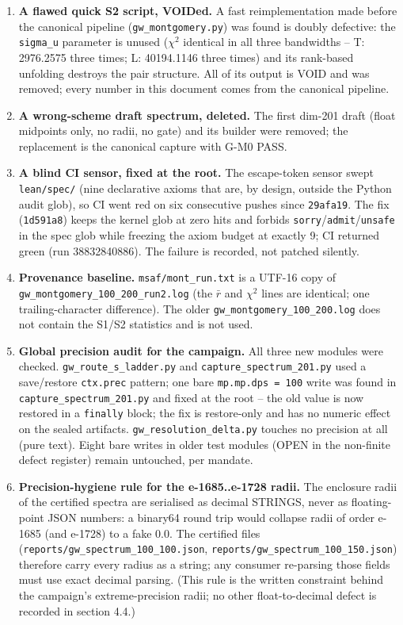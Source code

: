 \documentclass[11pt]{article}
\begin{document}
\begin{enumerate}
\item \textbf{A flawed quick S2 script, VOIDed.} A fast reimplementation
made before the canonical pipeline (\texttt{gw\_montgomery.py}) was
found is doubly defective: the \texttt{sigma\_u} parameter is unused
($\chi^2$ identical in all three bandwidths -- T: 2976.2575 three
times; L: 40194.1146 three times) and its rank-based unfolding destroys
the pair structure. All of its output is VOID and was removed; every
number in this document comes from the canonical pipeline.
\item \textbf{A wrong-scheme draft spectrum, deleted.} The first dim-201
draft (float midpoints only, no radii, no gate) and its builder were
removed; the replacement is the canonical capture with G-M0 PASS.
\item \textbf{A blind CI sensor, fixed at the root.} The escape-token
sensor swept \texttt{lean/spec/} (nine declarative axioms that are, by
design, outside the Python audit glob), so CI went red on six
consecutive pushes since \texttt{29afa19}. The fix (\texttt{1d591a8})
keeps the kernel glob at zero hits and forbids
\texttt{sorry}/\texttt{admit}/\texttt{unsafe} in the spec glob while
freezing the axiom budget at exactly 9; CI returned green (run
38832840886). The failure is recorded, not patched silently.
\item \textbf{Provenance baseline.} \texttt{msaf/mont\_run.txt} is a
UTF-16 copy of \texttt{gw\_montgomery\_100\_200\_run2.log} (the
$\bar r$ and $\chi^2$ lines are identical; one trailing-character
difference). The older \texttt{gw\_montgomery\_100\_200.log} does not
contain the S1/S2 statistics and is not used.
\item \textbf{Global precision audit for the campaign.} All three new
modules were checked. \texttt{gw\_route\_s\_ladder.py} and
\texttt{capture\_spectrum\_201.py} used a save/restore \texttt{ctx.prec}
pattern; one bare \texttt{mp.mp.dps = 100} write was found in
\texttt{capture\_spectrum\_201.py} and fixed at the root -- the old
value is now restored in a \texttt{finally} block; the fix is
restore-only and has no numeric effect on the sealed artifacts.
\texttt{gw\_resolution\_delta.py} touches no precision at all (pure
text). Eight bare writes in older test modules (OPEN in the non-finite
defect register) remain untouched, per mandate.
\item \textbf{Precision-hygiene rule for the e-1685..e-1728 radii.} The
enclosure radii of the certified spectra are serialised as decimal
STRINGS, never as floating-point JSON numbers: a binary64 round trip
would collapse radii of order e-1685 (and e-1728) to a fake 0.0. The
certified files (\texttt{reports/gw\_spectrum\_100\_100.json},
\texttt{reports/gw\_spectrum\_100\_150.json}) therefore carry every
radius as a string; any consumer re-parsing those fields must use exact
decimal parsing. (This rule is the written constraint behind the
campaign's extreme-precision radii; no other float-to-decimal defect is
recorded in section 4.4.)
\end{enumerate}
\end{document}
